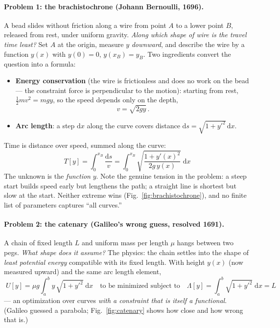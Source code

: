 \documentclass[11pt]{article}
\theoremstyle{plain}
\theoremstyle{definition}
\theoremstyle{remark}
\newcommand{\dd}{\mathrm{d}}
\begin{document}
\paragraph{Problem 1: the brachistochrone (Johann Bernoulli, 1696).}
A bead slides without friction along a wire from point $A$ to a lower
point $B$, released from rest, under uniform gravity. \emph{Along which
shape of wire is the travel time least?} Set $A$ at the origin, measure
$y$ \emph{downward}, and describe the wire by a function $y(x)$ with
$y(0)=0$, $y(x_B) = y_B$. Two ingredients convert the question into a
formula:
\begin{itemize}
  \item \textbf{Energy conservation} (the wire is frictionless and does no
  work on the bead --- the constraint force is perpendicular to the
  motion): starting from rest, $\tfrac12 mv^2 = mgy$, so the speed depends
  only on the depth,
  \begin{equation}
    v = \sqrt{2gy}\,.
  \end{equation}
  \item \textbf{Arc length}: a step $\dd x$ along the curve covers distance
  $\dd s = \sqrt{1 + y'^2}\,\dd x$.
\end{itemize}
Time is distance over speed, summed along the curve:
\begin{equation}
  \boxed{\;
  T[y] = \int_0^{x_B} \frac{\dd s}{v}
       = \int_0^{x_B} \sqrt{\frac{1 + y'(x)^2}{2g\,y(x)}}\;\dd x
  \;}
  \label{eq:brachisto-functional}
\end{equation}
The unknown is the \emph{function} $y$. Note the genuine tension in the
problem: a steep start builds speed early but lengthens the path; a
straight line is shortest but slow at the start. Neither extreme wins
(Fig.~\ref{fig:brachistochrone}), and no finite list of parameters
captures ``all curves.''

\paragraph{Problem 2: the catenary (Galileo's wrong guess, resolved 1691).}
A chain of fixed length $L$ and uniform mass per length $\mu$ hangs
between two pegs. \emph{What shape does it assume?} The physics: the chain
settles into the shape of \emph{least potential energy} compatible with its
fixed length. With height $y(x)$ (now measured upward) and the same arc
length element,
\begin{equation}
  \boxed{\;
  U[y] = \mu g \int_a^b y\,\sqrt{1+y'^2}\;\dd x
  \quad\text{to be minimized subject to}\quad
  \Lambda[y] = \int_a^b \sqrt{1+y'^2}\;\dd x = L
  \;}
  \label{eq:catenary-functional}
\end{equation}
--- an optimization over curves \emph{with a constraint that is itself a
functional}. (Galileo guessed a parabola; Fig.~\ref{fig:catenary} shows
how close and how wrong that is.)
\end{document}
